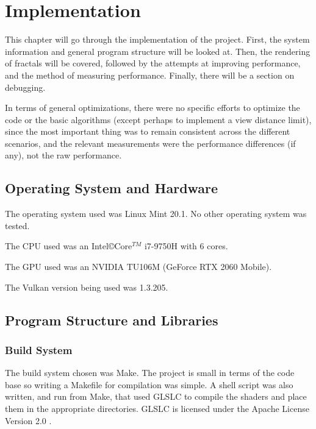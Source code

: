 \chapter{Implementation}
\label{chapter:implementation}

This chapter will go through the implementation of the project. First, the system information and general program structure will be looked at. Then, the rendering of fractals will be covered, followed by the attempts at improving performance, and the method of measuring performance. Finally, there will be a section on debugging.\newline

In terms of general optimizations, there were no specific efforts to optimize the code or the basic algorithms (except perhaps to implement a view distance limit), since the most important thing was to remain consistent across the different scenarios, and the relevant measurements were the performance differences (if any), not the raw performance.

\section{Operating System and Hardware}

The operating system used was Linux Mint 20.1. No other operating system was tested.\newline

The CPU used was an Intel\copyright Core$^{TM}$ i7-9750H with 6 cores.

The GPU used was an NVIDIA TU106M (GeForce RTX 2060 Mobile).

The Vulkan version being used was 1.3.205.

\section{Program Structure and Libraries}

\subsection{Build System}

The build system chosen was Make. The project is small in terms of the code base so writing a Makefile for compilation was simple. A shell script was also written, and run from Make, that used GLSLC to compile the shaders and place them in the appropriate directories. GLSLC is licensed under the Apache License Version 2.0 \cite{licensing-glslc}.

